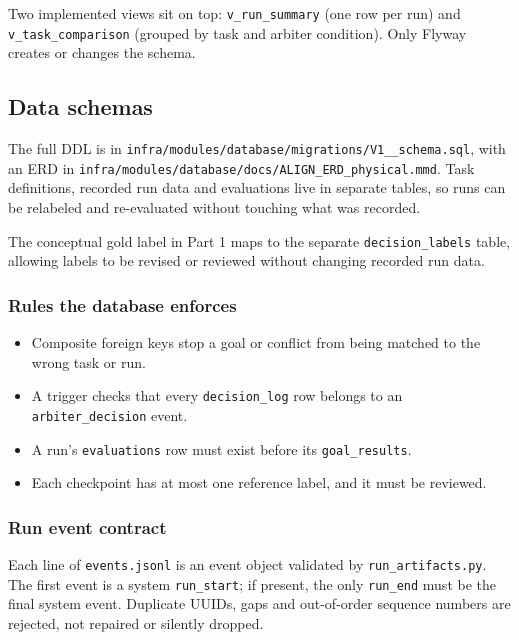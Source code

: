 \documentclass[11pt]{article}
\newcommand{\code}[1]{\texttt{#1}}
\begin{document}
Two implemented views sit on top: \code{v\_run\_summary} (one row per run) and \code{v\_task\_comparison} (grouped by task and arbiter condition). Only Flyway creates or changes the schema.

\subsection*{Data schemas}

The full DDL is in \nolinkurl{infra/modules/database/migrations/V1__schema.sql}, with an ERD in \nolinkurl{infra/modules/database/docs/ALIGN_ERD_physical.mmd}. Task definitions, recorded run data and evaluations live in separate tables, so runs can be relabeled and re-evaluated without touching what was recorded.



The conceptual gold label in Part 1 maps to the separate \code{decision\_labels} table, allowing labels to be revised or reviewed without changing recorded run data.

\subsubsection*{Rules the database enforces}

\begin{itemize}
  \item Composite foreign keys stop a goal or conflict from being matched to the wrong task or run.
  \item A trigger checks that every \code{decision\_log} row belongs to an \code{arbiter\_decision} event.
  \item A run's \code{evaluations} row must exist before its \code{goal\_results}.
  \item Each checkpoint has at most one reference label, and it must be reviewed.
\end{itemize}

\subsubsection*{Run event contract}

Each line of \code{events.jsonl} is an event object validated by \code{run\_artifacts.py}. The first event is a system \code{run\_start}; if present, the only \code{run\_end} must be the final system event. Duplicate UUIDs, gaps and out-of-order sequence numbers are rejected, not repaired or silently dropped.
\end{document}
